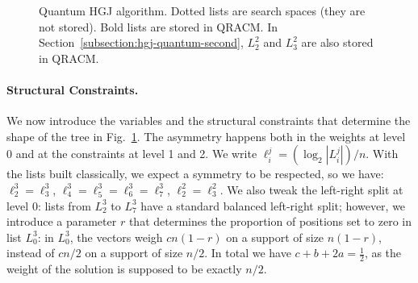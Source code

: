 \begin{figure}[htb]
{}
\caption{Quantum HGJ algorithm. Dotted lists are search spaces (they are not stored). Bold lists are stored in QRACM. In Section~\ref{subsection:hgj-quantum-second}, $L_2^2$ and $L_3^2$ are also stored in QRACM.}
\label{fig:hgj-quantum}
\end{figure}

\paragraph{Structural Constraints.}
We now introduce the variables and the structural constraints that determine the shape of the tree in Fig.~\ref{fig:hgj-quantum}. The asymmetry happens both in the weights at level 0 and at the constraints at level 1 and 2. We write $\ell_i^j = (\log_2 | L_i^j|) / n$. With the lists built classically, we expect a symmetry to be respected, so we have: $\ell_2^3 = \ell_3^3$, $\ell_4^3 = \ell_5^3 = \ell_6^3 = \ell_7^3$, $\ell_2^2 = \ell_3^2$. We also tweak the left-right split at level 0: lists from $L_2^3$ to $L_7^3$ have a standard balanced left-right split; however, we introduce a parameter $r$ that determines the proportion of positions set to zero in list $L_0^3$: in $L_0^3$, the vectors weigh $cn(1-r)$ on a support of size $n(1-r)$, instead of $cn/2$ on a support of size $n/2$. In total we have $c + b + 2a = \frac{1}{2}$, as the weight of the solution is supposed to be exactly $n/2$.

